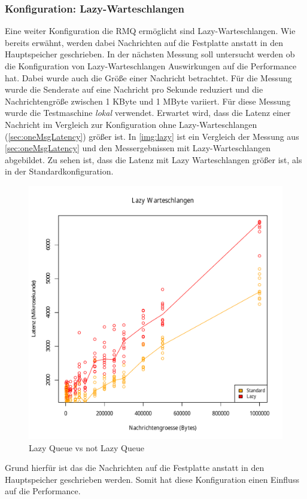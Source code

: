 \subsubsection{Konfiguration: Lazy-Warteschlangen}
\label{sec:rmqLazy}
Eine weiter Konfiguration die RMQ ermöglicht sind Lazy-Warteschlangen. Wie bereits erwähnt, werden dabei Nachrichten auf die Festplatte anstatt in den Hauptspeicher geschrieben. In der nächsten Messung soll untersucht werden ob die Konfiguration von Lazy-Warteschlangen Auswirkungen auf die Performance hat. Dabei wurde auch die Größe einer Nachricht betrachtet. Für die Messung wurde die Senderate auf eine Nachricht pro Sekunde reduziert und die Nachrichtengröße zwischen 1 KByte und 1 MByte variiert. Für diese Messung wurde die Testmaschine \textit{lokal} verwendet. Erwartet wird, dass die Latenz einer Nachricht im Vergleich zur Konfiguration ohne Lazy-Warteschlangen (\autoref{sec:oneMsgLatency}) größer ist.
In \autoref{img:lazy} ist ein Vergleich der Messung aus \autoref{sec:oneMsgLatency} und den Messergebnissen mit Lazy-Warteschlangen abgebildet. Zu sehen ist, dass die Latenz mit Lazy Warteschlangen größer ist, als in der Standardkonfiguration.
\begin{figure}
\center
  \includegraphics[width=1\textwidth]{images/measurement/lazy-queues.pdf}
  \caption{Lazy Queue vs not Lazy Queue}
  \label{img:lazy}
\end{figure}
Grund hierfür ist das die Nachrichten auf die Festplatte anstatt in den Hauptspeicher geschrieben werden. Somit hat diese Konfiguration einen Einfluss auf die Performance.



